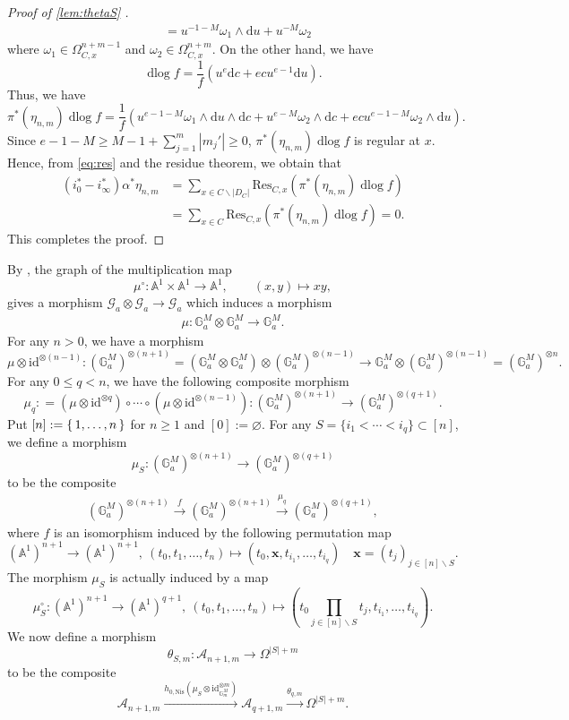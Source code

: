 \documentclass[a4paper,12pt,reqno]{amsart}
\numberwithin{equation}{section}
\theoremstyle{definition}
\newcommand{\bA}{\mathbb{A}}
\DeclareMathOperator{\dlog}{dlog}
\newcommand{\Id}{\mathrm{id}}
\renewcommand{\d}{\mathrm{d}}
\newcommand{\Acal}{\mathcal{A}}
\newcommand{\GaMod}{\mathbb{G}_{a}^{M}}
\newcommand{\GmMod}{\mathbb G_m^M}
\newcommand{\Nis}{\mathrm{Nis}}
\newcommand{\Gapair}{\mathcal{G}_a}
\begin{document}
\begin{proof}[Proof of \autoref{lem:thetaS} ]
\begin{align}
        &=u^{-1-M}\omega_1\wedge \d u+u^{-M}\omega_2
    \end{align}
    where $\omega_1\in \Omega^{n+m-1}_{C,x}$ and $\omega_2\in \Omega_{C,x}^{n+m}$.
    On the other hand, we have
    \[
    \dlog f=\frac{1}{f}(u^e\d c+ecu^{e-1}\d u).
    \]
    Thus, we have 
    \[
    \pi^\ast(\eta_{n,m})\dlog f
    =\frac{1}{f}(u^{e-1-M}\omega_1\wedge \d u \wedge \d c
    +u^{e-M}\omega_2\wedge \d c
    +ecu^{e-1-M}\omega_2\wedge \d u).
    \]
    Since $e-1-M\geq M-1+\sum_{j=1}^m |m_j'|\geq 0$, $\pi^\ast(\eta_{n,m})\dlog f$ is regular at $x$.
    Hence, from \eqref{eq:res} and the residue theorem, we obtain that
    \begin{align*}
        (i_0^\ast-i_\infty^\ast)\alpha^\ast \eta_{n,m}
        &=\sum_{x\in C\smallsetminus |D_C|}\mathrm{Res}_{C,x}(\pi^\ast(\eta_{n,m})\dlog f )\\
        &=\sum_{x\in C}\mathrm{Res}_{C,x}(\pi^\ast(\eta_{n,m})\dlog f )=0.
    \end{align*}
    This completes the proof.
\end{proof}

By \cite[Lemma~5.1.1]{KMSY3}, the graph of the multiplication map
\[
 \mu^\circ\colon \bA^1\times\bA^1\to\bA^1,
 \qquad
 (x,y)\mapsto xy,
\]
gives a morphism $\Gapair\otimes \Gapair\to \Gapair$ which induces a morphism 
\begin{align}\label{mult-Ga}
    \mu\colon \GaMod\otimes\GaMod\to\GaMod.
\end{align}
For any $n>0$, we have a morphism
\[
\mu\otimes \Id^{\otimes (n-1)}
\colon
(\GaMod)^{\otimes (n+1)}=(\GaMod\otimes \GaMod)\otimes (\GaMod)^{\otimes (n-1)}\to \GaMod\otimes (\GaMod)^{\otimes (n-1)}=(\GaMod)^{\otimes n}.
\]
For any $0\le q<n$, we have the following composite morphism 
\[
\mu_q\colon=(\mu\otimes \Id^{\otimes q})\circ \cdots \circ (\mu\otimes \Id^{\otimes (n-1)})\colon (\GaMod)^{\otimes (n+1)}\to  (\GaMod)^{\otimes (q+1)}.
\]
Put $[n]:=\set{1,\ldots,n}$ for $n\geq1$ and $[0]:=\varnothing$.  
For any $S=\{i_1<\cdots <i_q\}\subset[n]$, we define a morphism 
\[
\mu_S:(\GaMod)^{\otimes (n+1)}\to (\GaMod)^{\otimes (q+1)}
\]
to be the composite
\begin{align}
    (\GaMod)^{\otimes (n+1)}\xrightarrow{f}(\GaMod)^{\otimes (n+1)} \xrightarrow{\mu_q} (\GaMod)^{\otimes (q+1)},
\end{align}
where $f$ is an isomorphism induced by the following permutation map
\[
(\bA^1)^{n+1}\to (\bA^1)^{n+1},\ (t_0, t_1, \dots,t_n)\mapsto (t_0, \boldsymbol{x}, t_{i_1},\dots, t_{i_q}) \quad \boldsymbol{x}=(t_j)_{j\in[n]\smallsetminus S}.
\]
The morphism $\mu_S$ is actually induced by a map
\[
    \mu_S^\circ \colon (\bA^1)^{n+1}\to (\bA^1)^{q+1},\ (t_0, t_1, \dots,t_n)\mapsto (t_0\prod_{j\in[n]\smallsetminus S}t_j, t_{i_1},\dots, t_{i_q}).
    \]
We now define a morphism
\[
\theta_{S,m} \colon \Acal_{n+1,m}\to \Omega^{|S|+m}
\]
to be the composite
\[
\Acal_{n+1,m}\xrightarrow{h_{0,\Nis}(\mu_S\otimes \Id_{\GmMod}^{\otimes m})}\Acal_{q+1,m} \xrightarrow{\theta_{q,m}} \Omega^{|S|+m}.
\]
\end{document}
